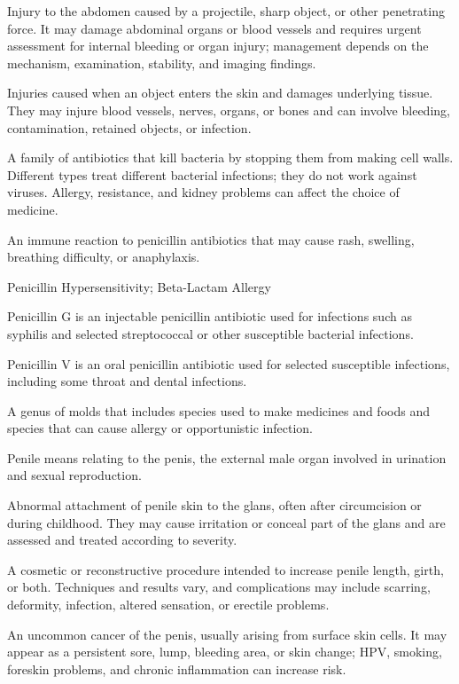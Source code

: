 Injury to the abdomen caused by a projectile, sharp object, or other penetrating
force. It may damage abdominal organs or blood vessels and requires urgent assessment for internal bleeding or organ
injury; management depends on the mechanism, examination, stability, and imaging findings.

 Injuries caused when an object enters the skin and damages underlying tissue. They may injure blood vessels, nerves, organs, or bones and can involve bleeding, contamination, retained objects, or infection.

 A family of antibiotics that kill bacteria by stopping them from making cell walls. Different types treat different bacterial infections; they do not work against viruses. Allergy, resistance, and kidney problems can affect the choice of medicine.

 An immune reaction to penicillin antibiotics that may cause rash, swelling, breathing difficulty, or anaphylaxis.

\synonyms
Penicillin Hypersensitivity; Beta-Lactam Allergy

 Penicillin G is an injectable penicillin antibiotic used for infections such as syphilis and selected streptococcal or other susceptible bacterial infections.

 Penicillin V is an oral penicillin antibiotic used for selected susceptible infections, including some throat and dental infections.

 A genus of molds that includes species used to make medicines and foods and species that can cause allergy or opportunistic infection.

 Penile means relating to the penis, the external male organ involved in urination and sexual reproduction.

 Abnormal attachment of penile skin to the glans, often after circumcision or during childhood. They may cause irritation or conceal part of the glans and are assessed and treated according to severity.

 A cosmetic or reconstructive procedure intended to increase penile length, girth, or both. Techniques and results vary, and complications may include scarring, deformity, infection, altered sensation, or erectile problems.

 An uncommon cancer of the penis, usually arising from surface skin cells. It may appear as a persistent sore, lump, bleeding area, or skin change; HPV, smoking, foreskin problems, and chronic inflammation can increase risk.

